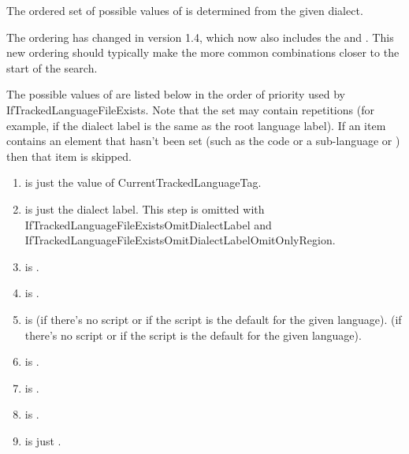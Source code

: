 \documentclass[titlepage=false,oneside,
 fontsize=12pt,captions=tableheading]{scrbook}
\begin{document}
The ordered set of possible values of  is determined from
the given dialect.
\begin{important}
The ordering has changed in version 1.4, which now also includes the
 and . This new ordering should typically make the more
common combinations closer to the start of the search.
\end{important}
The possible values of  are listed below in the order of priority used
by \gls{IfTrackedLanguageFileExists}. Note that the set may contain
repetitions (for example, if the dialect label is the same as the
root language label). If an item contains an element that hasn't
been set (such as the  code or a sub-language
 or ) then
that item is skipped.
\begin{enumerate}
\item {} is just the value of \gls{CurrentTrackedLanguageTag}.

\item {} is just the dialect label.
This step is omitted with \gls{IfTrackedLanguageFileExistsOmitDialectLabel}
and \gls{IfTrackedLanguageFileExistsOmitDialectLabelOmitOnlyRegion}.

\item {} is
\code{-}\code{-}\code{-}.

\item {} is
\code{-}\code{-}.

\item {} is
\code{-}\code{-} (if there's no script or if
the script is the default for the given language).
\code{-} (if there's no script or if
the script is the default for the given language).

\item {} is
\code{-}\code{-}.

\item {} is
\code{-}.

\item {} is \code{-}.

\item {} is just .


\end{enumerate}
\end{document}
